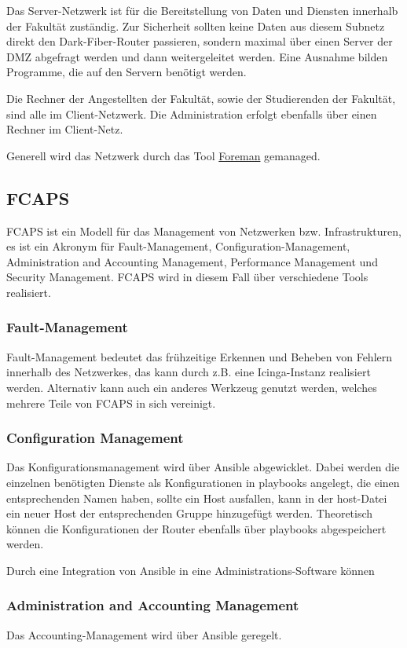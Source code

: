 \documentclass[a4paper]{article}
\begin{document}
Das Server-Netzwerk ist für die Bereitstellung von Daten und Diensten innerhalb der Fakultät zuständig. Zur Sicherheit sollten keine Daten aus diesem Subnetz direkt den Dark-Fiber-Router passieren, sondern maximal über einen Server der DMZ abgefragt werden und dann weitergeleitet werden. Eine Ausnahme bilden Programme, die auf den Servern benötigt werden.

Die Rechner der Angestellten der Fakultät, sowie der Studierenden der Fakultät, sind alle im Client-Netzwerk. Die Administration erfolgt ebenfalls über einen Rechner im Client-Netz.

Generell wird das Netzwerk durch das Tool \href{www.theforeman.org}{Foreman} gemanaged. 

\subsection{FCAPS}
FCAPS ist ein Modell für das Management von Netzwerken bzw. Infrastrukturen, es ist ein Akronym für Fault-Management, Configuration-Management, Administration and Accounting Management, Performance Management und Security Management. FCAPS wird in diesem Fall über verschiedene Tools realisiert.


\subsubsection{Fault-Management}
Fault-Management bedeutet das frühzeitige Erkennen und Beheben von Fehlern innerhalb des Netzwerkes, das kann durch z.B. eine Icinga-Instanz realisiert werden. Alternativ kann auch ein anderes Werkzeug genutzt werden, welches mehrere Teile von FCAPS in sich vereinigt.

\subsubsection{Configuration Management}
Das Konfigurationsmanagement wird über Ansible abgewicklet. Dabei werden die einzelnen benötigten Dienste als Konfigurationen in playbooks angelegt, die einen entsprechenden Namen haben, sollte ein Host ausfallen, kann in der host-Datei ein neuer Host der entsprechenden Gruppe hinzugefügt werden. Theoretisch können die Konfigurationen der Router ebenfalls über playbooks abgespeichert werden. 

Durch eine Integration von Ansible in eine Administrations-Software können 

\subsubsection{Administration and Accounting Management}
Das Accounting-Management wird über Ansible geregelt. 
\end{document}

